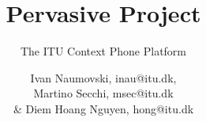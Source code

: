 \documentclass{scrartcl}
\begin{document}
\title{Pervasive Project}
\subtitle{The ITU Context Phone Platform}
\author{Ivan Naumovski, inau@itu.dk,\\ Martino Secchi, msec@itu.dk\\ \& Diem Hoang Nguyen, hong@itu.dk}

\maketitle
\tableofcontents





\end{document}
